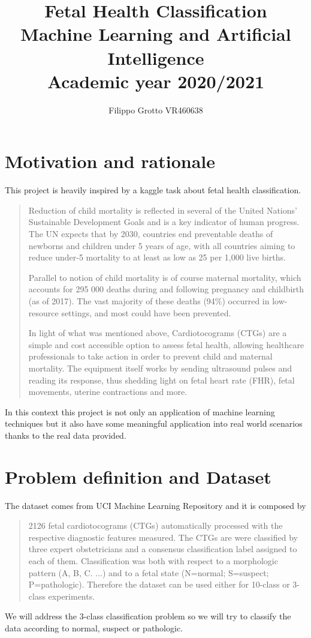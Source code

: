 \documentclass[a4paper,12pt]{article}
\begin{document}
\author{Filippo Grotto VR460638}

\title{Fetal Health Classification  \\[1ex] \large Machine Learning and Artificial Intelligence \\[1ex] \large Academic year 2020/2021}

\maketitle
\newpage
\tableofcontents
\newpage

\section{Motivation and rationale}
This project is heavily inspired by a kaggle task \cite{kaggle} about fetal health classification.
\begin{quote}
Reduction of child mortality is reflected in several of the United Nations' Sustainable Development Goals and is a key indicator of human progress.
The UN expects that by 2030, countries end preventable deaths of newborns and children under 5 years of age, with all countries aiming to reduce under‑5 mortality to at least as low as 25 per 1,000 live births.

Parallel to notion of child mortality is of course maternal mortality, which accounts for 295 000 deaths during and following pregnancy and childbirth (as of 2017). The vast majority of these deaths (94\%) occurred in low-resource settings, and most could have been prevented.

In light of what was mentioned above, Cardiotocograms (CTGs) are a simple and cost accessible option to assess fetal health, allowing healthcare professionals to take action in order to prevent child and maternal mortality. The equipment itself works by sending ultrasound pulses and reading its response, thus shedding light on fetal heart rate (FHR), fetal movements, uterine contractions and more.
\end{quote}
In this context this project is not only an application of machine learning techniques but it also have some meaningful application into real world scenarios thanks to the real data provided.


\section{Problem definition and Dataset}
The dataset comes from UCI Machine Learning Repository \cite{uci} and it is composed by 
\begin{quote}
2126 fetal cardiotocograms (CTGs) automatically processed with the respective diagnostic features measured. The CTGs are were classified by three expert obstetricians and a consensus classification label assigned to each of them. Classification was both with respect to a morphologic pattern (A, B, C. ...) and to a fetal state (N=normal; S=suspect; P=pathologic). Therefore the dataset can be used either for 10-class or 3-class experiments.
\end{quote}
We will address the 3-class classification problem so we will try to classify the data according to normal, suspect or pathologic.
\end{document}

